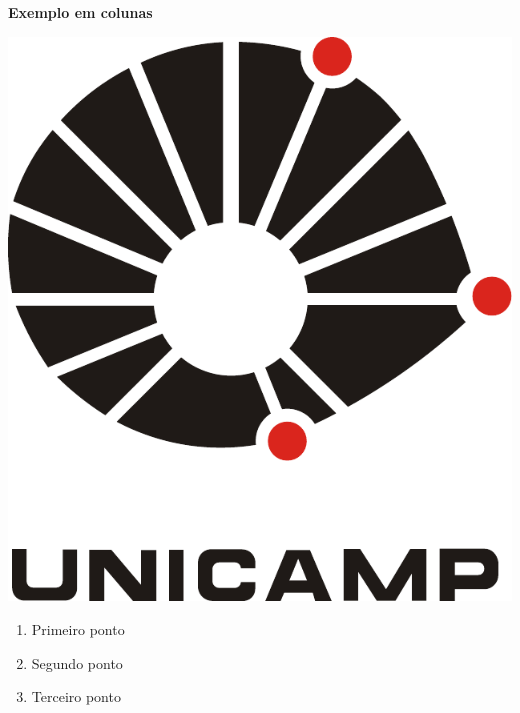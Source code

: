 \documentclass[landscape]{slides}
\newcommand{\stitle}[1]{{\Large\bfseries #1}}
\begin{document}
\begin{slide}
\stitle{Exemplo em colunas}

\begin{minipage}[t][122mm][c]{125mm}

\centering\includegraphics[width=0.8\hsize]{unicamp-logo}

\end{minipage}%
\hfill%
\begin{minipage}[t][122mm][c]{125mm}

\begin{enumerate}
\item Primeiro ponto
\item Segundo ponto
\item Terceiro ponto
\end{enumerate}

\end{minipage}

\end{slide}
\end{document}
